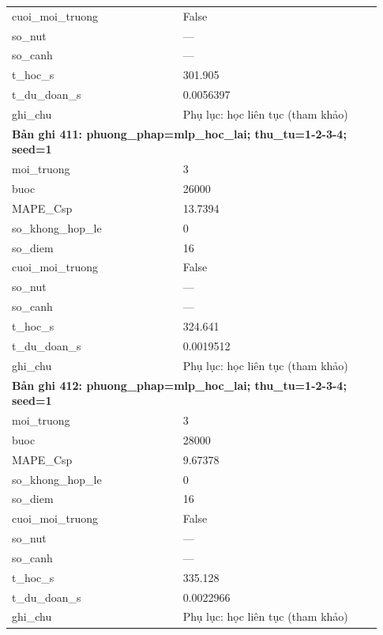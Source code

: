 \begin{longtable}{p{0.43\linewidth}p{0.50\linewidth}}
cuoi\_\allowbreak moi\_\allowbreak truong & False \\
so\_\allowbreak nut & — \\
so\_\allowbreak canh & — \\
t\_\allowbreak hoc\_\allowbreak s & 301.905 \\
t\_\allowbreak du\_\allowbreak doan\_\allowbreak s & 0.0056397 \\
ghi\_\allowbreak chu & Phụ lục: học liên tục (tham khảo) \\
\midrule
\multicolumn{2}{p{0.95\linewidth}}{\textbf{Bản ghi 411: phuong\_phap=mlp\_hoc\_lai; thu\_tu=1-2-3-4; seed=1}} \\
moi\_\allowbreak truong & 3 \\
buoc & 26000 \\
MAPE\_\allowbreak Csp & 13.7394 \\
so\_\allowbreak khong\_\allowbreak hop\_\allowbreak le & 0 \\
so\_\allowbreak diem & 16 \\
cuoi\_\allowbreak moi\_\allowbreak truong & False \\
so\_\allowbreak nut & — \\
so\_\allowbreak canh & — \\
t\_\allowbreak hoc\_\allowbreak s & 324.641 \\
t\_\allowbreak du\_\allowbreak doan\_\allowbreak s & 0.0019512 \\
ghi\_\allowbreak chu & Phụ lục: học liên tục (tham khảo) \\
\midrule
\multicolumn{2}{p{0.95\linewidth}}{\textbf{Bản ghi 412: phuong\_phap=mlp\_hoc\_lai; thu\_tu=1-2-3-4; seed=1}} \\
moi\_\allowbreak truong & 3 \\
buoc & 28000 \\
MAPE\_\allowbreak Csp & 9.67378 \\
so\_\allowbreak khong\_\allowbreak hop\_\allowbreak le & 0 \\
so\_\allowbreak diem & 16 \\
cuoi\_\allowbreak moi\_\allowbreak truong & False \\
so\_\allowbreak nut & — \\
so\_\allowbreak canh & — \\
t\_\allowbreak hoc\_\allowbreak s & 335.128 \\
t\_\allowbreak du\_\allowbreak doan\_\allowbreak s & 0.0022966 \\
ghi\_\allowbreak chu & Phụ lục: học liên tục (tham khảo) \\

\end{longtable}
